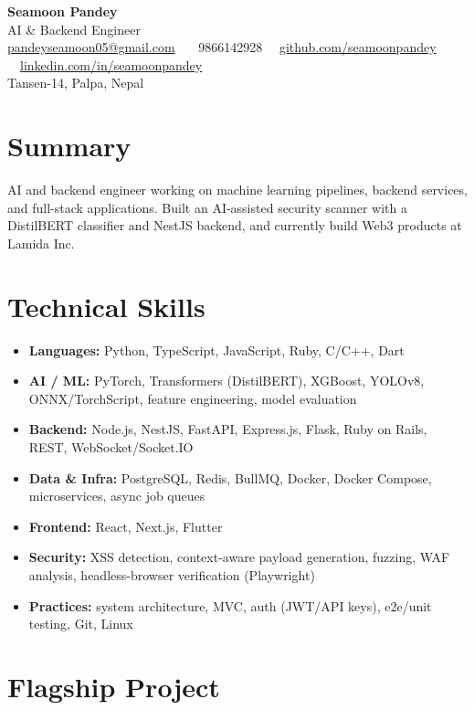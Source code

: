 \documentclass[a4paper,10pt]{article}
\begin{document}
\begin{center}
{\LARGE \textbf{Seamoon Pandey}}\\[2pt]
{\color{rulegray}AI \& Backend Engineer}\\[3pt]
\href{mailto:pandeyseamoon05@gmail.com}{pandeyseamoon05@gmail.com} \ \textbar\ \ 9866142928 \ \textbar\
\href{https://github.com/seamoonpandey}{github.com/seamoonpandey} \ \textbar\
\href{https://www.linkedin.com/in/seamoonpandey/}{linkedin.com/in/seamoonpandey}\\[2pt]
{\color{rulegray}\small Tansen-14, Palpa, Nepal}
\end{center}

\section*{Summary}

AI and backend engineer working on machine learning pipelines, backend services, and full-stack applications. Built an AI-assisted security scanner with a DistilBERT classifier and NestJS backend, and currently build Web3 products at Lamida Inc.

\section*{Technical Skills}

\begin{itemize}
\item \textbf{Languages:} Python, TypeScript, JavaScript, Ruby, C/C++, Dart
\item \textbf{AI / ML:} PyTorch, Transformers (DistilBERT), XGBoost, YOLOv8, ONNX/TorchScript, feature engineering, model evaluation
\item \textbf{Backend:} Node.js, NestJS, FastAPI, Express.js, Flask, Ruby on Rails, REST, WebSocket/Socket.IO
\item \textbf{Data \& Infra:} PostgreSQL, Redis, BullMQ, Docker, Docker Compose, microservices, async job queues
\item \textbf{Frontend:} React, Next.js, Flutter
\item \textbf{Security:} XSS detection, context-aware payload generation, fuzzing, WAF analysis, headless-browser verification (Playwright)
\item \textbf{Practices:} system architecture, MVC, auth (JWT/API keys), e2e/unit testing, Git, Linux
\end{itemize}

\section*{Flagship Project}
\end{document}
